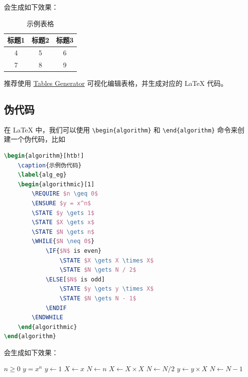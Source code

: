 \noindent 会生成如下效果：

\begin{table}[htb!]
    \caption{示例表格}
    \centering
    \begin{tabular}{ccc}
        \hline
        标题1 & 标题2 & 标题3 \\
        \hline
        4   & 5   & 6   \\
        7   & 8   & 9   \\
        \hline
    \end{tabular}
    \label{tab_eg}
\end{table}

推荐使用 \href{https://www.tablesgenerator.com/}{Tables Generator} 可视化编辑表格，并生成对应的 LaTeX 代码。

\subsection{伪代码}

在 LaTeX 中，我们可以使用 \texttt{\textbackslash begin\{algorithm\}} 和 \texttt{\textbackslash end\{algorithm\}} 命令来创建一个伪代码，比如

\begin{lstlisting}[language=TeX]
\begin{algorithm}[htb!]
    \caption{示例伪代码}
    \label{alg_eg}
    \begin{algorithmic}[1]
        \REQUIRE $n \geq 0$
        \ENSURE $y = x^n$
        \STATE $y \gets 1$
        \STATE $X \gets x$
        \STATE $N \gets n$
        \WHILE{$N \neq 0$}
            \IF{$N$ is even}
                \STATE $X \gets X \times X$
                \STATE $N \gets N / 2$
            \ELSE[$N$ is odd]
                \STATE $y \gets y \times X$
                \STATE $N \gets N - 1$
            \ENDIF
        \ENDWHILE
    \end{algorithmic}
\end{algorithm}
\end{lstlisting}

\noindent 会生成如下效果：

\begin{algorithm}[htb!]
    \caption{示例伪代码}
    \label{alg_eg}
    \begin{algorithmic}[1]
        \REQUIRE $n \geq 0$
        \ENSURE $y = x^n$
        \STATE $y \gets 1$
        \STATE $X \gets x$
        \STATE $N \gets n$
        \STATE $X \gets X \times X$
        \STATE $N \gets N / 2$
        \ELSE[$N$ is odd]
        \STATE $y \gets y \times X$
        \STATE $N \gets N - 1$
        \ENDIF
        \ENDWHILE
    \end{algorithmic}
\end{algorithm}

